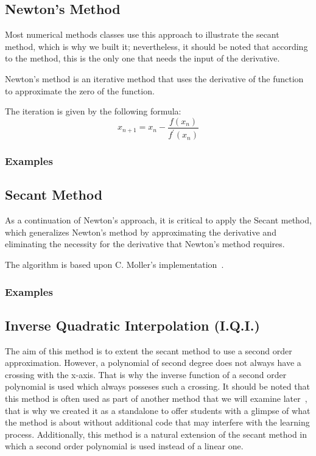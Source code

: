 \subsection{Newton's Method}
Most numerical methods classes use this approach to illustrate the secant method, which is why we built it; nevertheless, it should be noted that according to the method, this is the only one that needs the input of the derivative.

Newton's method is an iterative method that uses the derivative of the function to approximate the zero of the function. 

The iteration is given by the following formula:
\[
    x_{n+1} = x_n - \frac{f(x_n)}{f^\prime (x_n)}    
\]
\subsubsection{Examples}
	


\subsection{Secant Method}
As a continuation of Newton's approach, it is critical to apply the Secant method, which generalizes Newton's method by approximating the derivative and eliminating the necessity for the derivative that Newton's method requires. 

The algorithm is based upon C. Moller's implementation~\cite{doi:10.1137/1.9780898717952}.
\subsubsection{Examples}
	

\subsection{Inverse Quadratic Interpolation (I.Q.I.)}
The aim of this method is to extent the secant method to use a second order approximation. However, a polynomial of second degree does not always have a crossing with the x-axis. That is why the inverse function of a second order polynomial is used which always posseses such a crossing. It should be noted that this method is often used as part of another method that we will examine later~\cite{10.5555/2553197}, that is why we created it as a standalone to offer students with a glimpse of what the method is about without additional code that may interfere with the learning process. Additionally, this method is a natural extension of the secant method in which a second order polynomial is used instead of a linear one.

